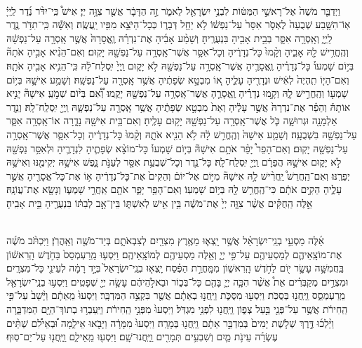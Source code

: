 \documentclass[twoside, openany, parskip=half, 11pt]{book}
\begin{document}
\begin{footnotesize}
\begin{multicols}{2}
\\
 וַיְדַבֵּ֤ר מֹשֶׁה֙ אֶל־רָאשֵׁ֣י הַמַּטּ֔וֹת לִבְנֵ֥י יִשְׂרָאֵ֖ל לֵאמֹ֑ר זֶ֣ה הַדָּבָ֔ר אֲשֶׁ֖ר צִוָּ֥ה יְיָ׃ אִישׁ֩ כִּֽי־יִדֹּ֨ר נֶ֜דֶר לַֽיְיָ֗ אֽוֹ־הִשָּׁ֤בַע שְׁבֻעָה֙ לֶאְסֹ֤ר אִסָּר֙ עַל־נַפְשׁ֔וֹ לֹ֥א יַחֵ֖ל דְּבָר֑וֹ כְּכָל־הַיֹּצֵ֥א מִפִּ֖יו יַֽעֲשֶֽׂה׃ וְאִשָּׁ֕ה כִּֽי־תִדֹּ֥ר נֶ֖דֶר לַֽיְיָ֑ וְאָֽסְרָ֥ה אִסָּ֛ר בְּבֵ֥ית אָבִ֖יהָ בִּנְעֻרֶֽיהָ׃ וְשָׁמַ֨ע אָבִ֜יהָ אֶת־נִדְרָ֗הּ וֶֽאֱסָרָהּ֙ אֲשֶׁ֣ר אָֽסְרָ֣ה עַל־נַפְשָׁ֔הּ וְהֶֽחֱרִ֥ישׁ לָ֖הּ אָבִ֑יהָ וְקָ֨מוּ֙ כָּל־נְדָרֶ֔יהָ וְכָל־אִסָּ֛ר אֲשֶׁר־אָֽסְרָ֥ה עַל־נַפְשָׁ֖הּ יָקֽוּם׃ וְאִם־הֵנִ֨יא אָבִ֣יהָ אֹתָהּ֘ בְּי֣וֹם שָׁמְעוֹ֒ כָּל־נְדָרֶ֗יהָ וֶֽאֱסָרֶ֛יהָ אֲשֶׁר־אָֽסְרָ֥ה עַל־נַפְשָׁ֖הּ לֹ֣א יָק֑וּם וַֽיְיָ֙ יִֽסְלַח־לָ֔הּ כִּֽי־הֵנִ֥יא אָבִ֖יהָ אֹתָֽהּ׃ וְאִם־הָי֤וֹ תִֽהְיֶה֙ לְאִ֔ישׁ וּנְדָרֶ֖יהָ עָלֶ֑יהָ א֚וֹ מִבְטָ֣א שְׂפָתֶ֔יהָ אֲשֶׁ֥ר אָֽסְרָ֖ה עַל־נַפְשָֽׁהּ׃ וְשָׁמַ֥ע אִישָׁ֛הּ בְּי֥וֹם שָׁמְע֖וֹ וְהֶֽחֱרִ֣ישׁ לָ֑הּ וְקָ֣מוּ נְדָרֶ֗יהָ וֶֽאֱסָרֶ֛הָ אֲשֶׁר־אָֽסְרָ֥ה עַל־נַפְשָׁ֖הּ יָקֻֽמוּ׃ וְ֠אִ֠ם בְּי֨וֹם שְׁמֹ֣עַֽ אִישָׁהּ֘ יָנִ֣יא אוֹתָהּ֒ וְהֵפֵ֗ר אֶת־נִדְרָהּ֙ אֲשֶׁ֣ר עָלֶ֔יהָ וְאֵת֙ מִבְטָ֣א שְׂפָתֶ֔יהָ אֲשֶׁ֥ר אָֽסְרָ֖ה עַל־נַפְשָׁ֑הּ וַֽיְיָ֖ יִֽסְלַֽח־לָֽהּ׃  וְנֵ֥דֶר אַלְמָנָ֖ה וּגְרוּשָׁ֑ה כֹּ֛ל אֲשֶׁר־אָֽסְרָ֥ה עַל־נַפְשָׁ֖הּ יָק֥וּם עָלֶֽיהָ׃ וְאִם־בֵּ֥ית אִישָׁ֖הּ נָדָ֑רָה אוֹ־אָֽסְרָ֥ה אִסָּ֛ר עַל־נַפְשָׁ֖הּ בִּשְׁבֻעָֽה׃ וְשָׁמַ֤ע אִישָׁהּ֙ וְהֶֽחֱרִ֣שׁ לָ֔הּ לֹ֥א הֵנִ֖יא אֹתָ֑הּ וְקָ֨מוּ֙ כָּל־נְדָרֶ֔יהָ וְכָל־אִסָּ֛ר אֲשֶׁר־אָֽסְרָ֥ה עַל־נַפְשָׁ֖הּ יָקֽוּם׃ וְאִם־הָפֵר֩ יָפֵ֨ר אֹתָ֥ם אִישָׁהּ֘ בְּי֣וֹם שָׁמְעוֹ֒ כָּל־מוֹצָ֨א שְׂפָתֶ֧יהָ לִנְדָרֶ֛יהָ וּלְאִסַּ֥ר נַפְשָׁ֖הּ לֹ֣א יָק֑וּם אִישָׁ֣הּ הֲפֵרָ֔ם וַֽיְיָ֖ יִֽסְלַֽח־לָֽהּ׃  כָּל־נֵ֛דֶר וְכָל־שְׁבֻעַ֥ת אִסָּ֖ר לְעַנֹּ֣ת נָ֑פֶשׁ אִישָׁ֥הּ יְקִימֶ֖נּוּ וְאִישָׁ֥הּ יְפֵרֶֽנּוּ׃ וְאִם־הַֽחֲרֵשׁ֩ יַֽחֲרִ֨ישׁ לָ֥הּ אִישָׁהּ֘ מִיּ֣וֹם אֶל־יוֹם֒ וְהֵקִים֙ אֶת־כָּל־נְדָרֶ֔יהָ א֥וֹ אֶת־כָּל־אֱסָרֶ֖יהָ אֲשֶׁ֣ר עָלֶ֑יהָ הֵקִ֣ים אֹתָ֔ם כִּי־הֶֽחֱרִ֥שׁ לָ֖הּ בְּי֥וֹם שָׁמְעֽוֹ׃ וְאִם־הָפֵ֥ר יָפֵ֛ר אֹתָ֖ם אַֽחֲרֵ֣י שָׁמְע֑וֹ וְנָשָׂ֖א אֶת־עֲוֹנָֽהּ׃ אֵ֣לֶּה הַֽחֻקִּ֗ים אֲשֶׁ֨ר צִוָּ֤ה יְיָ֙ אֶת־מֹשֶׁ֔ה בֵּ֥ין אִ֖ישׁ לְאִשְׁתּ֑וֹ בֵּין־אָ֣ב לְבִתּ֔וֹ בִּנְעֻרֶ֖יהָ בֵּ֥ית אָבִֽיהָ׃

\\
 אֵ֜לֶּה מַסְעֵ֣י בְנֵֽי־יִשְׂרָאֵ֗ל אֲשֶׁ֥ר יָֽצְא֛וּ מֵאֶ֥רֶץ מִצְרַ֖יִם לְצִבְאֹתָ֑ם בְּיַד־מֹשֶׁ֖ה וְאַֽהֲרֹֽן׃ וַיִּכְתֹּ֨ב מֹשֶׁ֜ה אֶת־מוֹצָֽאֵיהֶ֛ם לְמַסְעֵיהֶ֖ם עַל־פִּ֣י יְיָ֑ וְאֵ֥לֶּה מַסְעֵיהֶ֖ם לְמוֹצָֽאֵיהֶֽם׃ וַיִּסְע֤וּ מֵֽרַעְמְסֵס֙ בַּחֹ֣דֶשׁ הָֽרִאשׁ֔וֹן בַּֽחֲמִשָּׁ֥ה עָשָׂ֛ר י֖וֹם לַחֹ֣דֶשׁ הָֽרִאשׁ֑וֹן מִמָּֽחֳרַ֣ת הַפֶּ֗סַח יָֽצְא֤וּ בְנֵֽי־יִשְׂרָאֵל֙ בְּיָ֣ד רָמָ֔ה לְעֵינֵ֖י כָּל־מִצְרָֽיִם׃  וּמִצְרַ֣יִם מְקַבְּרִ֗ים אֵת֩ אֲשֶׁ֨ר הִכָּ֧ה יְיָ֛ בָּהֶ֖ם כָּל־בְּכ֑וֹר וּבֵאלֹ֣הֵיהֶ֔ם עָשָׂ֥ה יְיָ֖ שְׁפָטִֽים׃ וַיִּסְע֥וּ בְנֵֽי־יִשְׂרָאֵ֖ל מֵֽרַעְמְסֵ֑ס וַֽיַּֽחֲנ֖וּ בְּסֻכֹּֽת׃ וַיִּסְע֖וּ מִסֻּכֹּ֑ת וַיַּֽחֲנ֣וּ בְאֵתָ֔ם אֲשֶׁ֖ר בִּקְצֵ֥ה הַמִּדְבָּֽר׃  וַיִּסְעוּ֙ מֵֽאֵתָ֔ם וַיָּ֨שָׁב֙ עַל־פִּ֣י הַֽחִירֹ֔ת אֲשֶׁ֥ר עַל־פְּנֵ֖י בַּ֣עַל צְפ֑וֹן וַֽיַּֽחֲנ֖וּ לִפְנֵ֥י מִגְדֹּֽל׃ וַיִּסְעוּ֙ מִפְּנֵ֣י הַֽחִירֹ֔ת וַיַּֽעַבְר֥וּ בְתוֹךְ־הַיָּ֖ם הַמִּדְבָּ֑רָה וַיֵּ֨לְכ֜וּ דֶּ֣רֶךְ שְׁלֹ֤שֶׁת יָמִים֙ בְּמִדְבַּ֣ר אֵתָ֔ם וַֽיַּֽחֲנ֖וּ בְּמָרָֽה׃ וַיִּסְעוּ֙ מִמָּרָ֔ה וַיָּבֹ֖אוּ אֵילִ֑מָה וּ֠בְאֵילִ֠ם שְׁתֵּ֨ים עֶשְׂרֵ֜ה עֵינֹ֥ת מַ֛יִם וְשִׁבְעִ֥ים תְּמָרִ֖ים וַֽיַּֽחֲנוּ־שָֽׁם׃ וַיִּסְע֖וּ מֵֽאֵילִ֑ם וַֽיַּֽחֲנ֖וּ עַל־יַם־סֽוּף׃


\end{multicols}
\end{footnotesize}
\end{document}
